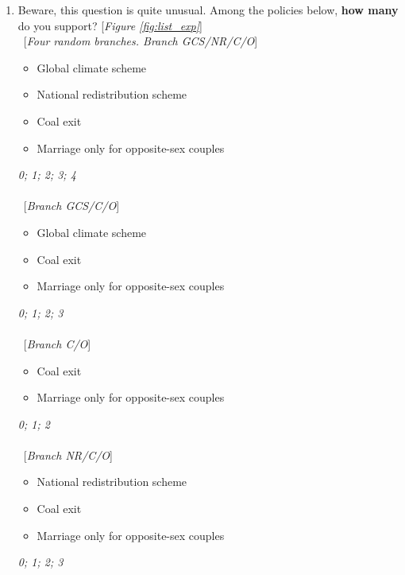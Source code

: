 \begin{enumerate}[resume]
\item \label{q:list_exp} Beware, this question is quite unusual. Among the policies below, \textbf{how many} do you support? [\textit{Figure \ref{fig:list_exp}}]\\
~[\textit{Four random branches. Branch GCS/NR/C/O}] \\
\begin{itemize} \vspace{-1em}
    \item Global climate scheme 
    \item National redistribution scheme
    \item Coal exit  
    \item Marriage only for opposite-sex couples
\end{itemize}
\textit{0; 1; 2; 3; 4}\\
\\
~[\textit{Branch GCS/C/O}] \\
\begin{itemize}  \vspace{-1em}
    \item Global climate scheme 
    \item Coal exit  
    \item Marriage only for opposite-sex couples
\end{itemize}
\textit{0; 1; 2; 3}\\
\\
~[\textit{Branch C/O}] \\
\begin{itemize}  \vspace{-1em}
    \item Coal exit  
    \item Marriage only for opposite-sex couples
\end{itemize}
\textit{0; 1; 2}\\
\\
~[\textit{Branch NR/C/O}] \\
\begin{itemize}  \vspace{-1em}
    \item National redistribution scheme 
    \item Coal exit  
    \item Marriage only for opposite-sex couples
\end{itemize}
\textit{0; 1; 2; 3}
\end{enumerate}

